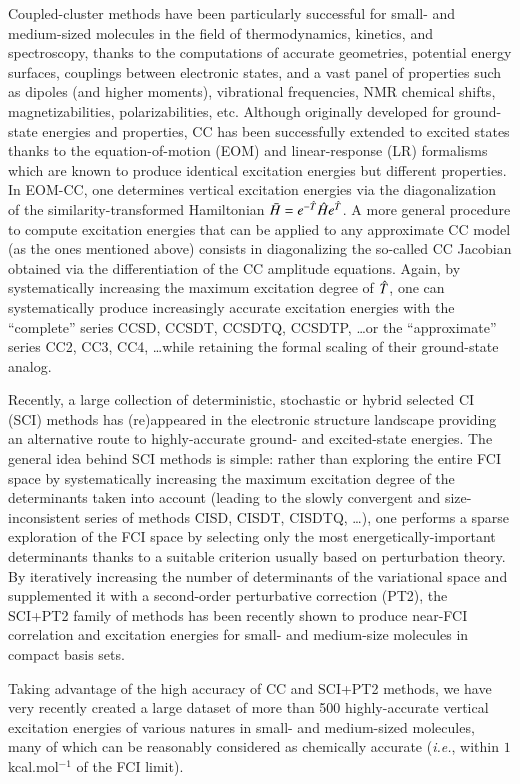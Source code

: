 \documentclass[aip,jcp,reprint,noshowkeys,superscriptaddress]{revtex4-1}
\newcommand{\ie}{\textit{i.e.}}
\newcommand{\hH}{\Hat{H}}
\newcommand{\hT}{\Hat{T}}
\newcommand{\bH}{\Bar{H}}
\begin{document}
Coupled-cluster methods have been particularly successful for small- and medium-sized molecules in the field of thermodynamics, kinetics, and spectroscopy, thanks to the computations of accurate geometries, potential energy surfaces, couplings between electronic states, and a vast panel of properties such as dipoles (and higher moments), vibrational frequencies, NMR chemical shifts, magnetizabilities, polarizabilities, etc.
Although originally developed for ground-state energies and properties, CC has been successfully extended to excited states thanks to the equation-of-motion (EOM) and linear-response (LR) formalisms which are known to produce identical excitation energies but different properties.
In EOM-CC, one determines vertical excitation energies via the diagonalization of the similarity-transformed Hamiltonian $\bH = e^{-\hT} \hH e^{\hT}$.
A more general procedure to compute excitation energies that can be applied to any approximate CC model (as the ones mentioned above) consists in diagonalizing the so-called CC Jacobian obtained via the differentiation of the CC amplitude equations.
Again, by systematically increasing the maximum excitation degree of $\hT$, one can systematically produce increasingly accurate excitation energies with the ``complete'' series CCSD, CCSDT, CCSDTQ, CCSDTP, \ldots or the ``approximate'' series CC2, CC3, CC4, \ldots while retaining the formal scaling of their ground-state analog.

Recently, a large collection of deterministic, stochastic or hybrid selected CI (SCI) methods has (re)appeared in the electronic structure landscape providing an alternative route to highly-accurate ground- and excited-state energies.
The general idea behind SCI methods is simple: rather than exploring the entire FCI space by systematically increasing the maximum excitation degree of the determinants taken into account (leading to the slowly convergent and size-inconsistent series of methods CISD, CISDT, CISDTQ, \ldots), one performs a sparse exploration of the FCI space by selecting only the most energetically-important determinants thanks to a suitable criterion usually based on perturbation theory.
By iteratively increasing the number of determinants of the variational space and supplemented it with a second-order perturbative correction (PT2), the SCI+PT2 family of methods has been recently shown to produce near-FCI correlation and excitation energies for small- and medium-size molecules in compact basis sets.

Taking advantage of the high accuracy of CC and SCI+PT2 methods, we have very recently created a large dataset of more than 500 highly-accurate vertical excitation energies of various natures in small- and medium-sized molecules, many of which can be reasonably considered as chemically accurate (\ie, within $1$ kcal.mol$^{-1}$ of the FCI limit).
\end{document}
